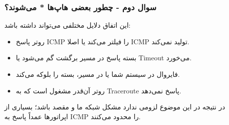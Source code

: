 \subsubsection*{سوال دوم - چطور بعضی هاپ‌ها * می‌شوند؟}


این اتفاق دلایل مختلفی می‌تواند داشته باشد:

\begin{itemize}
	\item 
	روتر پاسخ ICMP را فیلتر می‌کند یا اصلا ICMP تولید نمی‌کند.
	\item
	بسته پاسخ در مسیر برگشت گم می‌شود یا Timeout می‌خورد.
	\item 
	فایروال در سیستم شما یا در مسیر، بسته را بلوکه می‌کند.
	\item 
	روتر آن‌قدر مشغول است که به Traceroute پاسخ نمی‌دهد.
\end{itemize}


در نتیجه در این موضوع لزومی ندارد مشکل شبکه ما و مقصد باشد؛ بسیاری از
اپراتورها عمداً پاسخ به ICMP را محدود می‌کنند.







